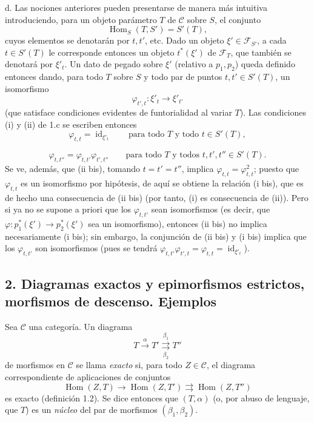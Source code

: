\medskip\noindent
d. Las nociones anteriores pueden presentarse de manera más intuitiva
introduciendo, para un objeto parámetro $T$ de $\mathcal C$ sobre $S$, el
conjunto
\[
  \operatorname{Hom}_S(T,S')=S'(T),
\]
cuyos elementos se denotarán por $t,t'$, etc. Dado un objeto
$\xi'\in\mathcal F_{S'}$, a cada $t\in S'(T)$ le corresponde entonces un objeto
$t^*(\xi')$ de $\mathcal F_T$, que también se denotará por $\xi'_t$. Un dato de
pegado sobre $\xi'$ (relativo a $p_1,p_2$) queda definido entonces dando, para
todo $T$ sobre $S$ y todo par de puntos $t,t'\in S'(T)$, un isomorfismo
\[
  \varphi_{t',t}:\xi'_t\longrightarrow\xi'_{t'}
\]
(que satisface condiciones evidentes de funtorialidad al variar $T$). Las
condiciones (i) y (ii) de 1.c se escriben entonces
\[
  \tag{i bis}
  \varphi_{t,t}=\operatorname{id}_{\xi'_t}
  \qquad\text{para todo $T$ y todo $t\in S'(T)$},
\]

\[
  \tag{ii bis}
  \varphi_{t,t''}=\varphi_{t,t'}\varphi_{t',t''}
  \qquad\text{para todo $T$ y todos $t,t',t''\in S'(T)$}.
\]
Se ve, además, que (ii bis), tomando $t=t'=t''$, implica
$\varphi_{t,t}=\varphi_{t,t}^2$; puesto que $\varphi_{t,t}$ es un isomorfismo
por hipótesis, de aquí se obtiene la relación (i bis), que es de hecho una
consecuencia de (ii bis) (por tanto, (i) es consecuencia de (ii)). Pero si ya
no se supone a priori que los $\varphi_{t,t'}$ sean isomorfismos (es decir, que
$\varphi:p_1^*(\xi')\longrightarrow p_2^*(\xi')$ sea un isomorfismo), entonces
(ii bis) no implica necesariamente (i bis); sin embargo, la conjunción de
(ii bis) y (i bis) implica que los $\varphi_{t,t'}$ son isomorfismos (pues se
tendrá
$\varphi_{t,t'}\varphi_{t',t}=\varphi_{t,t}=\operatorname{id}_{\xi'_t}$).

\subsection*{2. Diagramas exactos y epimorfismos estrictos, morfismos de
descenso. Ejemplos}

 Sea $\mathcal C$ una categoría. Un diagrama
\[
  T\xrightarrow{\alpha}T'
  \overset{\beta_1}{\underset{\beta_2}{\rightrightarrows}}T''
\]
de morfismos en $\mathcal C$ se llama \emph{exacto} si, para todo
$Z\in\mathcal C$, el diagrama correspondiente de aplicaciones de conjuntos
\[
  \operatorname{Hom}(Z,T)\longrightarrow
  \operatorname{Hom}(Z,T')
  \rightrightarrows\operatorname{Hom}(Z,T'')
\]
es exacto (definición 1.2). Se dice entonces que $(T,\alpha)$ (o, por abuso de
lenguaje, que $T$) es un \emph{núcleo} del par de morfismos
$(\beta_1,\beta_2)$.

